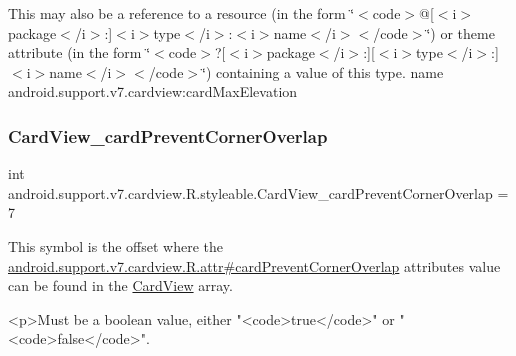 This may also be a reference to a resource (in the form \char`\"{}$<$code$>$@\mbox{[}$<$i$>$package$<$/i$>$\+:\mbox{]}$<$i$>$type$<$/i$>$\+:$<$i$>$name$<$/i$>$$<$/code$>$\char`\"{}) or theme attribute (in the form \char`\"{}$<$code$>$?\mbox{[}$<$i$>$package$<$/i$>$\+:\mbox{]}\mbox{[}$<$i$>$type$<$/i$>$\+:\mbox{]}$<$i$>$name$<$/i$>$$<$/code$>$\char`\"{}) containing a value of this type.  name android.\+support.\+v7.\+cardview\+:card\+Max\+Elevation \mbox{\label{classandroid_1_1support_1_1v7_1_1cardview_1_1R_1_1styleable_ae36059e966df9b6eab68d01218774027}} 
\subsubsection{\texorpdfstring{Card\+View\+\_\+card\+Prevent\+Corner\+Overlap}{CardView\_cardPreventCornerOverlap}}
{\footnotesize\ttfamily int android.\+support.\+v7.\+cardview.\+R.\+styleable.\+Card\+View\+\_\+card\+Prevent\+Corner\+Overlap = 7\hspace{0.3cm}{\ttfamily [static]}}

This symbol is the offset where the \hyperlink{classandroid_1_1support_1_1v7_1_1cardview_1_1R_1_1attr_af7e885084b6d221680d4118f1ead1764}{android.\+support.\+v7.\+cardview.\+R.\+attr\#card\+Prevent\+Corner\+Overlap} attribute\textquotesingle{}s value can be found in the \hyperlink{classandroid_1_1support_1_1v7_1_1cardview_1_1R_1_1styleable_ad08b98a07471f174f404c58941fc82ca}{Card\+View} array.

\begin{DoxyVerb}      <p>Must be a boolean value, either "<code>true</code>" or "<code>false</code>".
\end{DoxyVerb}
 

